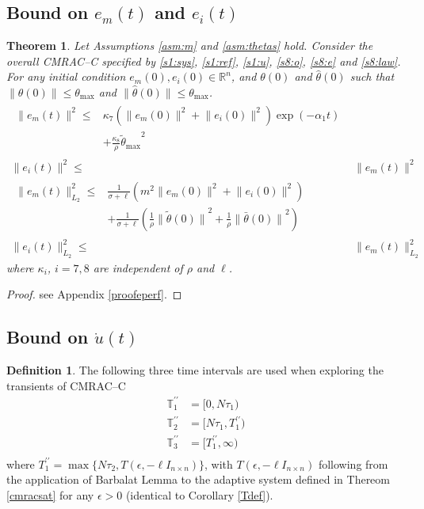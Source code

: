 \documentclass[10pt,journal]{IEEEtran}
\theoremstyle{plain}%
\newtheorem{thm}{Theorem}%
\theoremstyle{definition}
\newtheorem{defn}{Definition}%
\newcommand{\be}[0]{\begin{equation}}
\newcommand{\ee}[0]{\end{equation}}
\newcommand{\norms}[1]{\lVert#1\rVert}
\newcommand{\normB}[0]{\norms}
\let\norm=\normB
\renewcommand{\Re}[0]{\mathbb R}
\newcommand{\norml}[2]{\norm{#1}_{L_{#2}}}
\begin{document}
\subsection{Bound on $e_m(t)$ and $e_i(t)$}
\begin{thm} \label{eperf}Let Assumptions \ref{asm:m} and \ref{asm:thetas} hold. Consider the overall CMRAC--C specified by \eqref{s1:sys}, \eqref{s1:ref}, \eqref{s1:u},  \eqref{s8:o}, \eqref{s8:e} and \eqref{s8:law}. For any initial condition $e_m(0),e_i(0)\in \Re^n$, and $\theta(0)$ and $\hat\theta(0)$ such that $\norm{\theta(0)}\leq\theta_\text{max}$ and $\norm{\hat\theta(0)}\leq\theta_\text{max}$.
\begin{align}\begin{split}
\label{e2me}\norm {e_m(t)}^2 \leq& \kappa_7\left( \norm{e_m(0)}^2 +\norm{e_i(0)}^2\right) \exp \left(- \alpha_1 t \right) \\ &+ \frac{\kappa_8}{\rho} {\tilde\theta_\text{max}}^2\end{split} \\
\norm {e_i(t)}^2 \leq&\norm {e_m(t)}^2 \label{e2i} \\
\begin{split}
\label{eml2}\norml{e_m(t)}{2}^2 \leq& \frac{1}{\sigma+ \ell} \left(m^2 \norm{e_m(0)}^2 +\norm{e_i(0)}^2\right) \\& +\frac{1}{\sigma+ \ell} \left( \frac {1} {\rho} {\norm{\tilde\theta(0)}}^2+\frac {1} {\rho} {\norm{\bar\theta(0)}}^2 \right)\end{split}\\
\norml{e_i(t)}{2}^2 \leq& \norml{e_m(t)}{2}^2\label{eei2}
\end{align} where $\kappa_i$, $i=7,8$ are independent of $\rho$ and $\ell$.\end{thm}
\begin{proof}
see Appendix \ref{proofeperf}.\end{proof}

\subsection{Bound on $\dot u(t)$}


\begin{defn} The following three time intervals are used when exploring the transients of CMRAC--C
\be
\begin{split}
\mathbb T_1^{\prime\prime} &= [0,N\tau_1)\\ 
\mathbb T_2^{\prime\prime} &= [N\tau_1,T_1^{\prime\prime})\\
\mathbb T_3^{\prime\prime} &= [T_1^{\prime\prime},\infty)\\
\end{split}
\ee
where $T_1^{\prime\prime}=\max\{N\tau_2,T(\epsilon,-\ell I_{n\times n})\}$, with $T(\epsilon,-\ell I_{n\times n})$ following from the application of Barbalat Lemma to the adaptive system defined in Thereom \ref{cmracsat} for any $\epsilon>0$ (identical to Corollary \ref{Tdef}).\end{defn}
\end{document}
